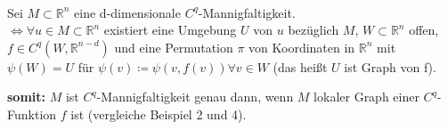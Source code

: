 \begin{sa}
\mbox{} \\
Sei $M \subset \mathbb{R}^{n}$ eine d-dimensionale $C^{q}$-Mannigfaltigkeit. \\
$\Longleftrightarrow \forall u \in M \subset \mathbb{R}^n $ existiert eine Umgebung
$U$ von $u$  bezüglich $M$, $W \subset \mathbb{R}^n $ offen, 
$f \in C^q (W, \mathbb{R}^{n-d})$ und eine Permutation $\pi$ von Koordinaten in
$\mathbb{R}^n $ mit $ \psi (W) = U $ für $ \psi (v) \coloneqq \psi (v, f(v)) 
\forall v \in W $ (das heißt $U$ ist Graph von f).
\end{sa}

\textbf{somit:} $M$ ist $C^q$-Mannigfaltigkeit genau dann, wenn $M$ lokaler Graph
einer $C^q$-Funktion $f$ ist (vergleiche Beispiel 2 und 4).

